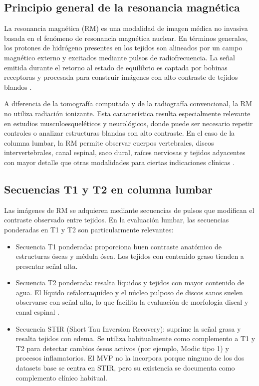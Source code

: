 \subsection{Principio general de la resonancia magnética}

La resonancia magnética (RM) es una modalidad de imagen médica no invasiva basada en el fenómeno de resonancia magnética nuclear. En términos generales, los protones de hidrógeno presentes en los tejidos son alineados por un campo magnético externo y excitados mediante pulsos de radiofrecuencia. La señal emitida durante el retorno al estado de equilibrio es captada por bobinas receptoras y procesada para construir imágenes con alto contraste de tejidos blandos \parencite{dale_mri_2016,mcrobbie_mri_2017}.

A diferencia de la tomografía computada y de la radiografía convencional, la RM no utiliza radiación ionizante. Esta característica resulta especialmente relevante en estudios musculoesqueléticos y neurológicos, donde puede ser necesario repetir controles o analizar estructuras blandas con alto contraste. En el caso de la columna lumbar, la RM permite observar cuerpos vertebrales, discos intervertebrales, canal espinal, saco dural, raíces nerviosas y tejidos adyacentes con mayor detalle que otras modalidades para ciertas indicaciones clínicas \parencite{modic_disk_1988,jarvik_deyo_low_back_pain_2002}.

\subsection{Secuencias T1 y T2 en columna lumbar}

Las imágenes de RM se adquieren mediante secuencias de pulsos que modifican el contraste observado entre tejidos. En la evaluación lumbar, las secuencias ponderadas en T1 y T2 son particularmente relevantes:

\begin{itemize}
  \item Secuencia T1 ponderada: proporciona buen contraste anatómico de estructuras óseas y médula ósea. Los tejidos con contenido graso tienden a presentar señal alta.
  \item Secuencia T2 ponderada: resalta líquidos y tejidos con mayor contenido de agua. El líquido cefalorraquídeo y el núcleo pulposo de discos sanos suelen observarse con señal alta, lo que facilita la evaluación de morfología discal y canal espinal \parencite{modic_disk_1988}.
  \item Secuencia STIR (Short Tau Inversion Recovery): suprime la señal grasa y resalta tejidos con edema. Se utiliza habitualmente como complemento a T1 y T2 para detectar cambios óseos activos (por ejemplo, Modic tipo 1) y procesos inflamatorios. El MVP no la incorpora porque ninguno de los dos datasets base se centra en STIR, pero su existencia se documenta como complemento clínico habitual.
\end{itemize}

